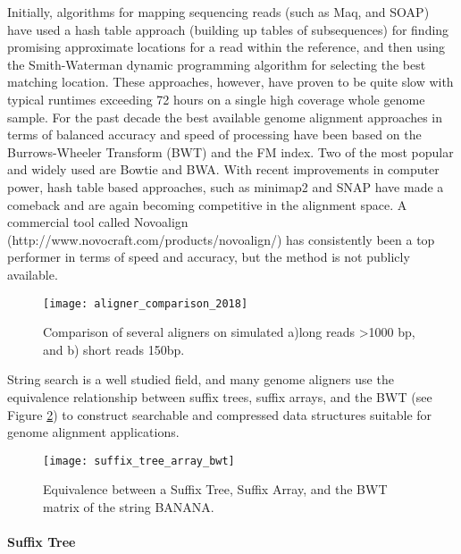 Initially, algorithms for mapping sequencing reads (such as Maq\autocite{li2008mapping}, and SOAP\autocite{li2008soap}) have used a hash table approach\autocite{reinert2015alignment} (building up tables of subsequences) for finding promising approximate locations for a read within the reference, and then using the Smith-Waterman\autocite{smith1981comparison} dynamic programming algorithm for selecting the best matching location. These approaches, however, have proven to be quite slow with typical runtimes exceeding 72 hours on a single high coverage whole genome sample. For the past decade the best available genome alignment approaches in terms of balanced accuracy and speed of processing have been based on the Burrows-Wheeler Transform (BWT)\autocite{burrows1994block} and the FM index\autocite{ferragina2000opportunistic}. Two of the most popular and widely used are Bowtie\autocite{langmead2009ultrafast} and BWA\autocite{li2009fast}. With recent improvements in computer power, hash table based approaches, such as minimap2\autocite{li2018minimap2} and SNAP\autocite{zaharia2011faster} have made a comeback and are again becoming competitive in the alignment space. A commercial tool called Novoalign (http://www.novocraft.com/products/novoalign/) has consistently been a top performer in terms of speed and accuracy, but the method is not publicly available.

\begin{figure}[H]
    \texttt{[image: aligner\_comparison\_2018]}
    \centering
    \caption {Comparison of several aligners on simulated a)long reads >1000 bp, and b) short reads 150bp.\autocite{li2018minimap2}}
    \label{fig:aligner_comparison_2018}
\end{figure}

String search is a well studied field, and many genome aligners use the equivalence relationship between suffix trees, suffix arrays, and the BWT (see Figure \ref{fig:suffix_tree_array_bwt}) to construct searchable and compressed data structures suitable for genome alignment applications.

\begin{figure}[H]
    \texttt{[image: suffix\_tree\_array\_bwt]}
    \centering
    \caption {Equivalence between a Suffix Tree, Suffix Array, and the BWT matrix of the string BANANA.\autocite{langmead_teaching}}
    \label{fig:suffix_tree_array_bwt}
\end{figure}

\paragraph{Suffix Tree}

